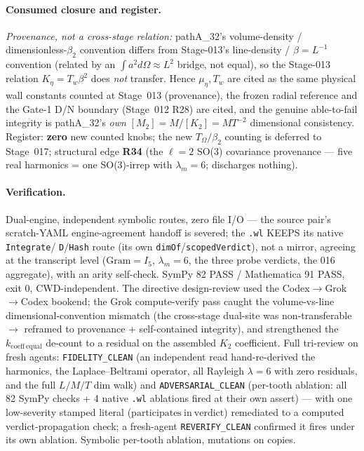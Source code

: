 \paragraph{Consumed closure and register.}
\emph{Provenance, not a cross-stage relation:} pathA\_32's volume-density / dimensionless-\(\beta_2\)
convention differs from Stage-013's line-density / \(\beta=L^{-1}\) convention (related by an
\(\int a^2 d\Omega\approx L^2\) bridge, not equal), so the Stage-013 relation \(K_\eta=T_w\beta^2\)
does \emph{not} transfer. Hence \(\mu_\eta,T_w\) are cited as the same physical wall constants
counted at Stage~013 (provenance), the frozen radial reference and the Gate-1 D/N boundary
(Stage~012 R28) are cited, and the genuine able-to-fail integrity is pathA\_32's \emph{own}
\([M_2]=M\)/\([K_2]=M T^{-2}\) dimensional consistency. Register: \textbf{zero} new counted
knobs; the new \(T_\Omega/\beta_2\) counting is deferred to Stage~017; structural edge
\textbf{R34} (the \(\ell=2\) SO(3) covariance provenance --- five real harmonics = one
SO(3)-irrep with \(\lambda_m=6\); discharges nothing).

\paragraph{Verification.}
Dual-engine, independent symbolic routes, zero file I/O --- the source pair's scratch-YAML
engine-agreement handoff is severed; the \texttt{.wl} KEEPS its native \texttt{Integrate}/
\texttt{D}/\texttt{Hash} route (its own \texttt{dimOf}/\texttt{scopedVerdict}), not a mirror,
agreeing at the transcript level (\(\mathrm{Gram}=I_5\), \(\lambda_m=6\), the three probe
verdicts, the 016 aggregate), with an arity self-check. SymPy 82 PASS / Mathematica 91 PASS,
exit 0, CWD-independent. The directive design-review used the Codex\(\to\)Grok\(\to\)Codex
bookend; the Grok compute-verify pass caught the volume-vs-line dimensional-convention mismatch
(the cross-stage dual-site was non-transferable \(\to\) reframed to provenance + self-contained
integrity), and strengthened the \(k_{\mathrm{coeff\ equal}}\) de-count to a residual on the
assembled \(K_2\) coefficient. Full tri-review on fresh agents: \texttt{FIDELITY\_CLEAN} (an
independent read hand-re-derived the harmonics, the Laplace--Beltrami operator, all Rayleigh
\(\lambda=6\) with zero residuals, and the full \(L/M/T\) dim walk) and \texttt{ADVERSARIAL\_CLEAN}
(per-tooth ablation: all 82 SymPy checks + 4 native \texttt{.wl} ablations fired at their own
assert) --- with one low-severity stamped literal (\(\mathrm{participates\ in\ verdict}\))
remediated to a computed verdict-propagation check; a fresh-agent \texttt{REVERIFY\_CLEAN}
confirmed it fires under its own ablation. Symbolic per-tooth ablation, mutations on copies.
